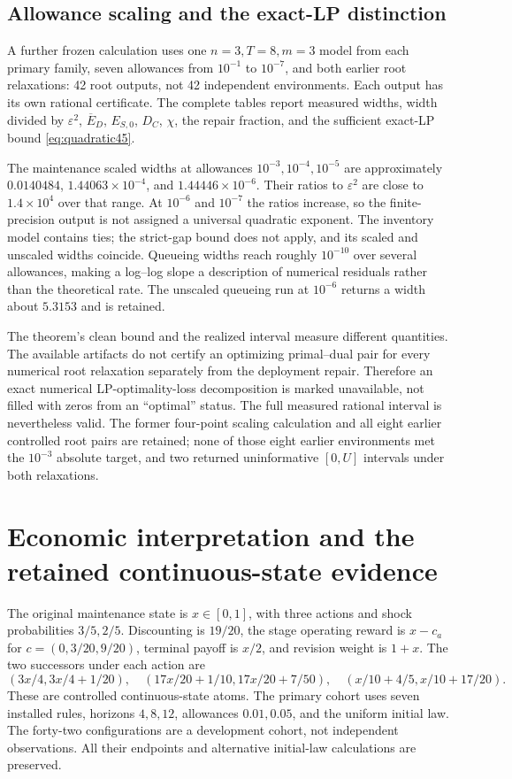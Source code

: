 \subsection{Allowance scaling and the exact-LP distinction}\label{sec:scaling45}
A further frozen calculation uses one $n=3,T=8,m=3$ model from each primary family, seven allowances from $10^{-1}$ to $10^{-7}$, and both earlier root relaxations: 42 root outputs, not 42 independent environments. Each output has its own rational certificate. The complete tables report measured widths, width divided by $\varepsilon^2$, $\overline E_D$, $E_{S,0}$, $D_C$, $\chi$, the repair fraction, and the sufficient exact-LP bound \eqref{eq:quadratic45}.

The maintenance scaled widths at allowances $10^{-3},10^{-4},10^{-5}$ are approximately $0.0140484$, $1.44063\times10^{-4}$, and $1.44446\times10^{-6}$. Their ratios to $\varepsilon^2$ are close to $1.4\times10^4$ over that range. At $10^{-6}$ and $10^{-7}$ the ratios increase, so the finite-precision output is not assigned a universal quadratic exponent. The inventory model contains ties; the strict-gap bound does not apply, and its scaled and unscaled widths coincide. Queueing widths reach roughly $10^{-10}$ over several allowances, making a log--log slope a description of numerical residuals rather than the theoretical rate. The unscaled queueing run at $10^{-6}$ returns a width about $5.3153$ and is retained.

The theorem's clean bound and the realized interval measure different quantities. The available artifacts do not certify an optimizing primal--dual pair for every numerical root relaxation separately from the deployment repair. Therefore an exact numerical LP-optimality-loss decomposition is marked unavailable, not filled with zeros from an ``optimal'' status. The full measured rational interval is nevertheless valid. The former four-point scaling calculation and all eight earlier controlled root pairs are retained; none of those eight earlier environments met the $10^{-3}$ absolute target, and two returned uninformative $[0,U]$ intervals under both relaxations.

\section{Economic interpretation and the retained continuous-state evidence}\label{sec:old45}
The original maintenance state is $x\in[0,1]$, with three actions and shock probabilities $3/5,2/5$. Discounting is $19/20$, the stage operating reward is $x-c_a$ for $c=(0,3/20,9/20)$, terminal payoff is $x/2$, and revision weight is $1+x$. The two successors under each action are
\[
 (3x/4,3x/4+1/20),\quad
 (17x/20+1/10,17x/20+7/50),\quad
 (x/10+4/5,x/10+17/20).
\]
These are controlled continuous-state atoms. The primary cohort uses seven installed rules, horizons $4,8,12$, allowances $0.01,0.05$, and the uniform initial law. The forty-two configurations are a development cohort, not independent observations. All their endpoints and alternative initial-law calculations are preserved.

